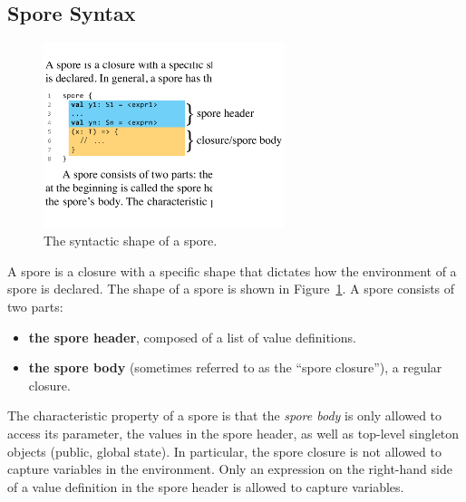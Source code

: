 \documentclass[runningheads]{llncs}
\begin{document}
\begin{sloppypar}
\vspace{1mm}
\subsection{Spore Syntax}
\label{sec:spore-syntax}

\setlength{\belowcaptionskip}{-6pt}
\begin{figure}[t!]
\centering
\includegraphics[width=7cm]{spore-shape.pdf}
\vspace{-0.4cm}
\caption{The syntactic shape of a spore.}
\label{fig:spore-shape}
\end{figure}
\setlength{\belowcaptionskip}{0pt}

A spore is a closure with a specific shape that dictates how the environment
of a spore is declared. The shape of a spore is shown in Figure~\ref{fig:spore-shape}.
A spore consists of two parts:
\vspace{-1.5mm}
\begin{itemize}
\item {\bf the spore header}, composed of a list of value definitions.
\item {\bf the spore body} (sometimes referred to as the ``spore closure''), a regular closure.
\end{itemize}


The characteristic property
of a spore is that the {\em spore body} is only allowed to access its
parameter, the values in the spore header, as well as top-level singleton objects
(public, global state). In particular, the spore closure is not allowed to
capture variables in the environment. Only an expression on the right-hand
side of a value definition in the spore header is allowed to capture
variables.


\end{sloppypar}
\end{document}
